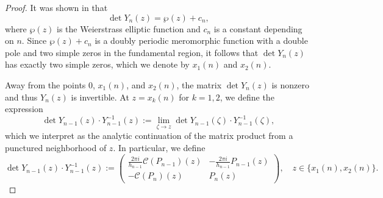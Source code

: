 \documentclass[11pt,a4paper]{article}
\theoremstyle{definition}
\numberwithin{equation}{section}
\numberwithin{theorem}{section}
\begin{document}
    \begin{proof}
It was shown in \cite[Lemma~2.3]{DLR24} that
\[
\det Y_n(z) = \wp(z) + c_n,
\]
where $\wp(z)$ is the Weierstrass elliptic function and $c_n$ is a constant depending on $n$. Since $\wp(z) + c_n$ is a doubly periodic meromorphic function with a double pole and two simple zeros in the fundamental region, it follows that $\det Y_n(z)$ has exactly two simple zeros, which we denote by $x_1(n)$ and $x_2(n)$.

Away from the points $0$, $x_1(n)$, and $x_2(n)$, the matrix $\det Y_n(z)$ is nonzero and thus $Y_n(z)$ is invertible. At $z = x_k(n)$ for $k = 1, 2$, we define the expression
\[
\det Y_{n-1}(z) \cdot Y_{n-1}^{-1}(z) := \lim_{\zeta \to z} \det Y_{n-1}(\zeta) \cdot Y_{n-1}^{-1}(\zeta),
\]
which we interpret as the analytic continuation of the matrix product from a punctured neighborhood of $z$. In particular, we define
\[
\det Y_{n-1}(z) \cdot Y_{n-1}^{-1}(z) := 
\begin{pmatrix}
\frac{2\pi i}{h_{n-1}} \mathcal{C}(P_{n-1})(z) & -\frac{2\pi i}{h_{n-1}} P_{n-1}(z) \\
-\mathcal{C}(P_n)(z) & P_n(z)
\end{pmatrix},
\quad z \in \{x_1(n), x_2(n)\}.
\]


\end{proof}
\end{document}
